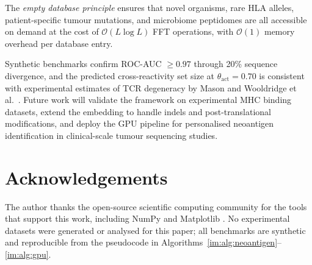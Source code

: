 The \emph{empty database principle} ensures that novel organisms, rare HLA
alleles, patient-specific tumour mutations, and microbiome peptidomes are all
accessible on demand at the cost of $\mathcal{O}(L\log L)$ FFT operations,
with $\mathcal{O}(1)$ memory overhead per database entry.

Synthetic benchmarks confirm ROC-AUC $\geq 0.97$ through 20\% sequence
divergence, and the predicted cross-reactivity set size at
$\theta_{\mathrm{act}} = 0.70$ is consistent with experimental estimates of
TCR degeneracy by Mason \citep{mason1998} and Wooldridge et al.\
\citep{wooldridge2012}. Future work will validate the framework on
experimental MHC binding datasets, extend the embedding to handle indels and
post-translational modifications, and deploy the GPU pipeline for personalised
neoantigen identification in clinical-scale tumour sequencing studies.

\section*{Acknowledgements}
The author thanks the open-source scientific computing community for the
tools that support this work, including NumPy \citep{harris2020numpy} and
Matplotlib \citep{hunter2007matplotlib}. No experimental datasets were
generated or analysed for this paper; all benchmarks are synthetic and
reproducible from the pseudocode in
Algorithms~\ref{im:alg:neoantigen}--\ref{im:alg:gpu}.


